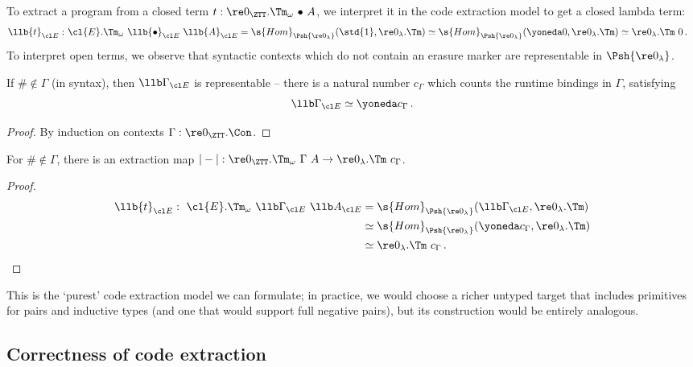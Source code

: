 \documentclass[a4paper,UKenglish,cleveref,autoref,thm-restate]{lipics-v2021}
\begin{document}
To extract a program from a closed \ZTT term $t : \re 0_{\ZTT}.\Tm_\omega\ {\bullet}\ A$,
we interpret it in the code extraction model to get a closed lambda term:
\[\begin{aligned}
  \llb{t}_{\cl E} :&\ \cl{E}.\Tm_{\omega}\ \llb{\bullet}_{\cl E}\ \llb{A}_{\cl E}
    = \s{Hom}_{\Psh {\re 0_\lambda}}(\std{1}, {\re 0_\lambda}.\Tm)
    \simeq \s{Hom}_{\Psh {\re 0_\lambda}}(\yoneda 0, {\re 0_\lambda}.\Tm)
    \simeq \re 0_\lambda.\Tm\ 0 \,.
\end{aligned}\]
To interpret open terms, we observe that syntactic contexts which do not contain an
erasure marker are representable in $\Psh{\re 0_\lambda}$.
\begin{lemma}
  If $\# \not\in \Gamma$ (in \ZTT syntax), then $\llb\Gamma_{\cl E}$
  is representable -- there is a natural number $c_\Gamma$ which
  counts the runtime bindings in $\Gamma$, satisfying
  \[
    \llb\Gamma_{\cl E} \simeq \yoneda c_\Gamma \,.
  \]
  \begin{proof}
    By induction on contexts $\Gamma : \re 0_{\ZTT}.\Con$.
  \end{proof}
\end{lemma}
\begin{corollary}
  For $\# \not\in \Gamma$, there is an extraction map $|-| : \re 0_{\ZTT}.\Tm_\omega\ \Gamma\ A 
   \to \re 0_{\lambda}.\Tm\ c_\Gamma$.
  \begin{proof}
  \[\begin{aligned}
    \llb{t}_{\cl E} :\ \cl{E}.\Tm_{\omega}\ \llb\Gamma_{\cl E}\ \llb A_{\cl E}
      &= \s{Hom}_{\Psh{\re 0_\lambda}}(\llb\Gamma_{\cl E}, {\re 0_\lambda}.\Tm) \\
      &\simeq \s{Hom}_{\Psh{\re 0_\lambda}}(\yoneda c_\Gamma, {\re 0_\lambda}.\Tm) \\
      &\simeq {\re 0_\lambda}.\Tm\ c_\Gamma \,.
  \end{aligned}\]
  \end{proof}
\end{corollary}

This is the `purest' code extraction model we can formulate; in practice, we
would choose a richer untyped target that includes primitives for pairs and
inductive types (and one that would support full negative pairs), but its construction
would be entirely analogous.

\subsection{Correctness of code extraction}\label{sub:code-extr-corr}
\end{document}
